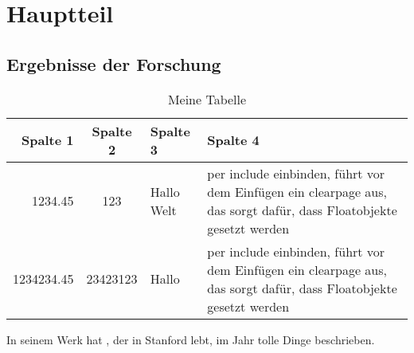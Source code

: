 \chapter{Hauptteil}
\section{Ergebnisse der Forschung}

\blindtext[20]

\begin{table}
\caption{Meine Tabelle}
\centering
\begin{tabular}{rclp{5cm}} \toprule[1.5pt]
\textbf{Spalte 1} & \textbf{Spalte 2} & \textbf{Spalte 3} & \textbf{Spalte 4} \\ \midrule
1234.45 & 123 & Hallo Welt & per include einbinden,  führt vor dem Einfügen ein clearpage aus, das sorgt dafür, dass Floatobjekte gesetzt werden \\
1234234.45 & 23423123 & Hallo &  per include einbinden,  führt vor dem Einfügen ein clearpage aus, das sorgt dafür, dass Floatobjekte gesetzt werden \\ \bottomrule[1.5pt]
\end{tabular}
\end{table}


\blindtext[20]

In seinem Werk  hat \citeauthor{knuth:1984}, der in Stanford lebt, im Jahr \citeyear{knuth:1984} tolle Dinge beschrieben.


